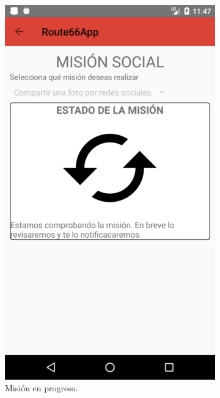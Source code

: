 \documentclass[twoside]{report}
\begin{document}
\begin{figure}[H]
\begin{center}
\begin{subfigure}[t]{.3\linewidth}
		\includegraphics[scale=0.25]{images/userguide/27.png}
		\caption{Misión en progreso.}
	\end{subfigure}\hspace{2mm}%
	\begin{subfigure}[t]{.3\linewidth}

\end{subfigure}
\end{center}
\end{figure}
\end{document}
